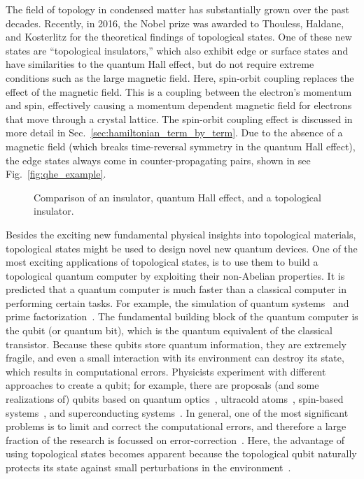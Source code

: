 The field of topology in condensed matter has substantially grown over the past decades.
Recently, in 2016, the Nobel prize was awarded to Thouless, Haldane, and Kosterlitz for the theoretical findings of topological states.
One of these new states are ``topological insulators,'' which also exhibit edge or surface states and have similarities to the quantum Hall effect, but do not require extreme conditions such as the large magnetic field.
Here, spin-orbit coupling replaces the effect of the magnetic field.
This is a coupling between the electron's momentum and spin, effectively causing a momentum dependent magnetic field for electrons that move through a crystal lattice.
The spin-orbit coupling effect is discussed in more detail in Sec.~\ref{sec:hamiltonian_term_by_term}.
Due to the absence of a magnetic field (which breaks time-reversal symmetry in the quantum Hall effect), the edge states always come in counter-propagating pairs, shown in see Fig.~\ref{fig:qhe_example}.

\begin{figure}[!htb]
\begin{center}
\caption{
Comparison of an insulator, quantum Hall effect, and a topological insulator.
\label{fig:qhe}}
\end{center}
\end{figure}

Besides the exciting new fundamental physical insights into topological materials, topological states might be used to design novel new quantum devices.
One of the most exciting applications of topological states, is to use them to build a topological quantum computer by exploiting their non-Abelian properties.
It is predicted that a quantum computer is much faster than a classical computer in performing certain tasks.
For example, the simulation of quantum systems~\cite{Feynman1982} and prime factorization~\cite{Shor1994}.
The fundamental building block of the quantum computer is the qubit (or quantum bit), which is the quantum equivalent of the classical transistor.
Because these qubits store quantum information, they are extremely fragile, and even a small interaction with its environment can destroy its state, which results in computational errors.
Physicists experiment with different approaches to create a qubit; for example, there are proposals (and some realizations of) qubits based on quantum optics~\cite{Kok2007}, ultracold atoms~\cite{Friis2018}, spin-based systems~\cite{Vandersypen2017}, and superconducting systems~\cite{Arute2019}.
In general, one of the most significant problems is to limit and correct the computational errors, and therefore a large fraction of the research is focussed on error-correction~\cite{Lidar2013}.
Here, the advantage of using topological states becomes apparent because the topological qubit naturally protects its state against small perturbations in the environment~\cite{Nayak2008}.

